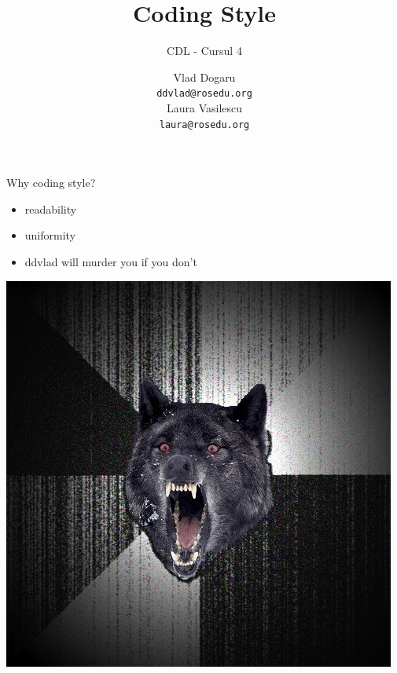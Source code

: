 \documentclass{beamer}
\title[]{Coding Style}
\subtitle{CDL - Cursul 4}
\institute[CDL 2011]{ROSEdu}
\author[]{Vlad Dogaru \\ \texttt{ddvlad@rosedu.org} \\ Laura Vasilescu \\
\texttt{laura@rosedu.org}}
\begin{document}
\maketitle

\begin{frame}{Why coding style?}
  \pause
  \begin{itemize}
    \item readability
    \pause
    \item uniformity
    \pause
    \item ddvlad will murder you if you don't
    \pause
  \end{itemize}
  \begin{center}
    \includegraphics[scale=0.3]{img/wolf}
  \end{center}
\end{frame}
\end{document}
